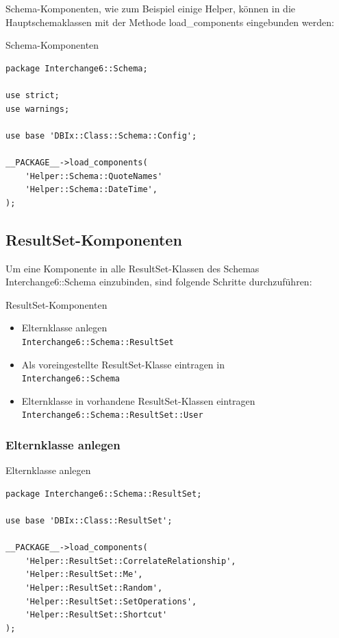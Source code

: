 Schema-Komponenten, wie zum Beispiel einige Helper, können in die
Hauptschemaklassen mit der Methode load\_components eingebunden werden:

\begin{frame}[fragile]{Schema-Komponenten}
  \begin{lstlisting}
package Interchange6::Schema;

use strict;
use warnings;

use base 'DBIx::Class::Schema::Config';

__PACKAGE__->load_components(
    'Helper::Schema::QuoteNames'
    'Helper::Schema::DateTime',
);
\end{lstlisting}
\end{frame}

\subsection{ResultSet-Komponenten}

Um eine Komponente in alle ResultSet-Klassen des Schemas
Interchange6::Schema einzubinden, sind folgende
Schritte durchzuführen:

\begin{frame}[fragile]{ResultSet-Komponenten}
\begin{itemize}
\item Elternklasse anlegen \\
  \verb|Interchange6::Schema::ResultSet|
\item Als voreingestellte ResultSet-Klasse eintragen in \\
  \verb|Interchange6::Schema|
\item Elternklasse in vorhandene ResultSet-Klassen eintragen \\
 \verb|Interchange6::Schema::ResultSet::User|
\end{itemize}
\end{frame}

\subsubsection{Elternklasse anlegen}

\begin{frame}[fragile]{Elternklasse anlegen}
\begin{lstlisting}
package Interchange6::Schema::ResultSet;

use base 'DBIx::Class::ResultSet';

__PACKAGE__->load_components(
    'Helper::ResultSet::CorrelateRelationship',
    'Helper::ResultSet::Me',
    'Helper::ResultSet::Random',
    'Helper::ResultSet::SetOperations',
    'Helper::ResultSet::Shortcut'
);

\end{lstlisting}
\end{frame}


